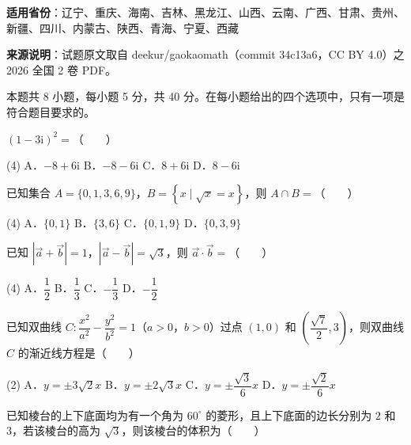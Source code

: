 

\begin{gknotice}
\textbf{适用省份}：辽宁、重庆、海南、吉林、黑龙江、山西、云南、广西、甘肃、贵州、新疆、四川、内蒙古、陕西、青海、宁夏、西藏

\textbf{来源说明}：试题原文取自 deekur/gaokaomath（commit 34c13a6，CC BY 4.0）之 2026 全国 2 卷 PDF。
\end{gknotice}

\par\medskip


\begin{gktip}
本题共 8 小题，每小题 5 分，共 40 分。在每小题给出的四个选项中，只有一项是符合题目要求的。
\end{gktip}

$(1-3\mathrm{i})^2=$（　　）

\begin{gkopts}(4)
\task A．$-8+6\mathrm{i}$
\task B．$-8-6\mathrm{i}$
\task C．$8+6\mathrm{i}$
\task D．$8-6\mathrm{i}$
\end{gkopts}

已知集合 $A=\{0,1,3,6,9\}$，$B=\left\{x\mid\sqrt{x}=x\right\}$，则 $A\cap B=$（　　）

\begin{gkopts}(4)
\task A．$\{0,1\}$
\task B．$\{3,6\}$
\task C．$\{0,1,9\}$
\task D．$\{0,3,9\}$
\end{gkopts}

已知 $\left|\vec{a}+\vec{b}\right|=1$，$\left|\vec{a}-\vec{b}\right|=\sqrt{3}$，则 $\vec{a}\cdot\vec{b}=$（　　）

\begin{gkopts}(4)
\task A．$\dfrac{1}{2}$
\task B．$\dfrac{1}{3}$
\task C．$-\dfrac{1}{3}$
\task D．$-\dfrac{1}{2}$
\end{gkopts}

已知双曲线 $C:\dfrac{x^2}{a^2}-\dfrac{y^2}{b^2}=1$（$a>0$，$b>0$）过点 $(1,0)$ 和 $\left(\dfrac{\sqrt{7}}{2},3\right)$，则双曲线 $C$ 的渐近线方程是（　　）

\begin{gkopts}(2)
\task A．$y=\pm3\sqrt{2}x$
\task B．$y=\pm2\sqrt{3}x$
\task C．$y=\pm\dfrac{\sqrt{3}}{6}x$
\task D．$y=\pm\dfrac{\sqrt{2}}{6}x$
\end{gkopts}

已知棱台的上下底面均为有一个角为 $60^\circ$ 的菱形，且上下底面的边长分别为 $2$ 和 $3$，若该棱台的高为 $\sqrt{3}$，则该棱台的体积为（　　）

